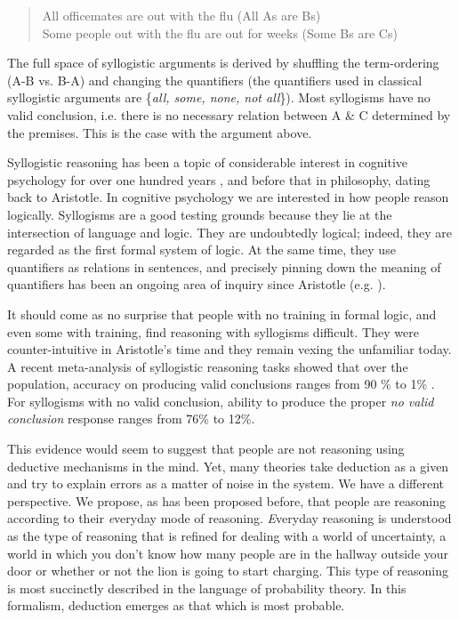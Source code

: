 \documentclass[10pt,letterpaper]{article}
\begin{document}
\begin{quote}
All officemates are out with the flu (All As are Bs)\\
Some people out with the flu are out for weeks (Some Bs are Cs)\\
\end{quote}

The full space of syllogistic arguments is derived by shuffling the term-ordering (A-B vs. B-A) and changing the quantifiers (the quantifiers used in classical syllogistic arguments are \{\emph{all, some, none, not all}\}). Most syllogisms have no valid conclusion, i.e. there is no necessary relation between A \& C determined by the premises. This is the case with the argument above.

Syllogistic reasoning has been a topic of considerable interest in cognitive psychology for over one hundred years \cite{storring1908}, and before that in philosophy, dating back to Aristotle. In cognitive psychology we are interested in how people reason logically. Syllogisms are a good testing grounds because they lie at the intersection of language and logic. They are undoubtedly logical; indeed, they are regarded as the first formal system of logic. At the same time, they use quantifiers as relations in sentences, and precisely pinning down the meaning of quantifiers has been an ongoing area of inquiry since Aristotle (e.g. \cite{negationHorn}).


It should come as no surprise that people with no training in formal logic, and even some with training, find reasoning with syllogisms difficult. They were counter-intuitive in Aristotle's time and they remain vexing the unfamiliar today. A recent meta-analysis of syllogistic reasoning tasks showed that over the population, accuracy on producing valid conclusions ranges from 90 \% to 1\% \cite{khemlaniJL2012}. For syllogisms with no valid conclusion, ability to produce the proper \emph{no valid conclusion} response ranges from 76\% to 12\%.

This evidence would seem to suggest that people are not reasoning using deductive mechanisms in the mind. Yet, many theories take deduction as a given and try to explain errors as a matter of noise in the system. We have a different perspective. We propose, as has been proposed before, that people are reasoning according to their {\emph everyday} mode of reasoning. {\emph Everyday} reasoning is understood as the type of reasoning that is refined for dealing with a world of uncertainty, a world in which you don't know how many people are in the hallway outside your door or whether or not the lion is going to start charging. This type of reasoning is most succinctly described in the language of probability theory. In this formalism, deduction emerges as that which is most probable.
\end{document}
